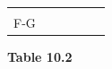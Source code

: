 {{\begin{center}
\begin{xtabular}[t]{|l|l|l|l|l|l|}
         &
         &
         &
     \tabularnewline{}
        F-G &
         &
         &
         &
         &
     \tabularnewline{}
    \end{xtabular}
      \end{center}
    \begin{center}{\small\bfseries Table 10.2}\end{center}
          } %
        }{%
}
